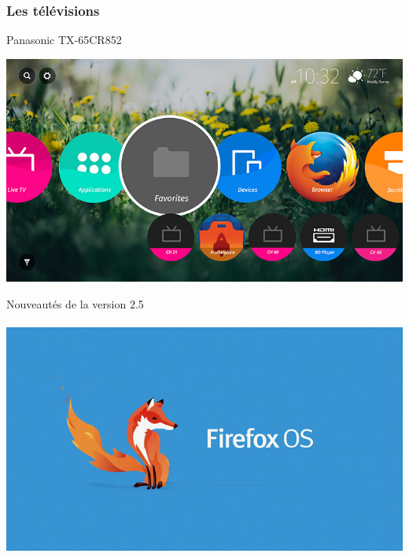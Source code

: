 \documentclass{beamer}
\begin{document}
\begin{frame}
\frametitle{Les télévisions}
\begin{block}{Panasonic TX-65CR852}
\begin{center}
\includegraphics[scale=0.38]{./images/firefox_os_tv.jpg}
\end{center}
\end{block} 
\end{frame}
\begin{frame}
\begin{center}
\Huge{Nouveautés de la version 2.5}
\\~\\
\includegraphics[scale=0.3]{./images/firefox-os.jpg}
\end{center}
\end{frame}
\end{document}
